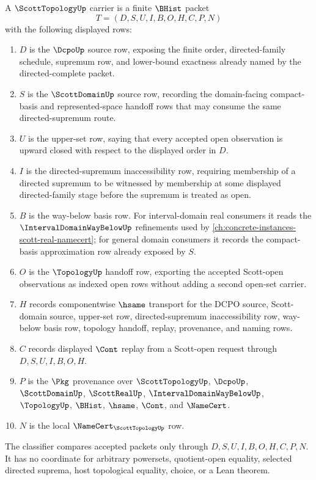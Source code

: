 \begin{definition}
\label{def:scott-topology-carrier}
A $\ScottTopologyUp$ carrier is a finite $\BHist$ packet
$$
T=(D,S,U,I,B,O,H,C,P,N)
$$
with the following displayed rows:
\begin{enumerate}
\item $D$ is the $\DcpoUp$ source row, exposing the finite order, directed-family schedule, supremum row, and lower-bound exactness already named by the directed-complete packet.
\item $S$ is the $\ScottDomainUp$ source row, recording the domain-facing compact-basis and represented-space handoff rows that may consume the same directed-supremum route.
\item $U$ is the upper-set row, saying that every accepted open observation is upward closed with respect to the displayed order in $D$.
\item $I$ is the directed-supremum inaccessibility row, requiring membership of a directed supremum to be witnessed by membership at some displayed directed-family stage before the supremum is treated as open.
\item $B$ is the way-below basis row. For interval-domain real consumers it reads the $\IntervalDomainWayBelowUp$ refinements used by \autoref{ch:concrete-instances-scott-real-namecert}; for general domain consumers it records the compact-basis approximation row already exposed by $S$.
\item $O$ is the $\TopologyUp$ handoff row, exporting the accepted Scott-open observations as indexed open rows without adding a second open-set carrier.
\item $H$ records componentwise $\hsame$ transport for the DCPO source, Scott-domain source, upper-set row, directed-supremum inaccessibility row, way-below basis row, topology handoff, replay, provenance, and naming rows.
\item $C$ records displayed $\Cont$ replay from a Scott-open request through $D,S,U,I,B,O,H$.
\item $P$ is the $\Pkg$ provenance over $\ScottTopologyUp$, $\DcpoUp$, $\ScottDomainUp$, $\ScottRealUp$, $\IntervalDomainWayBelowUp$, $\TopologyUp$, $\BHist$, $\hsame$, $\Cont$, and $\NameCert$.
\item $N$ is the local $\NameCert_{\ScottTopologyUp}$ row.
\end{enumerate}
The classifier compares accepted packets only through $D,S,U,I,B,O,H,C,P,N$. It has no coordinate for arbitrary powersets, quotient-open equality, selected directed suprema, host topological equality, choice, or a Lean theorem.
\end{definition}

